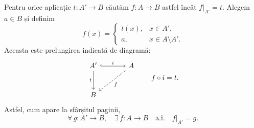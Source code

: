 \medskip
\noindent Pentru orice aplicație $t:A'\longrightarrow B$ căutăm
$f:A\longrightarrow B$ astfel încât $f|_{A'}=t$.
Alegem $a\in B$ și definim
\[
 f(x)=
 \begin{cases}
   t(x),&x\in A',\\
   a,&x\in A\setminus A'.
 \end{cases}
\]
Aceasta este prelungirea indicată de diagramă:
\[
\begin{tikzcd}[column sep=large,row sep=large]
 A'\arrow[r,hook,"i"]\arrow[d,"t"']
    & A\arrow[dl,dashed,"f"]\\
 B &
\end{tikzcd}
\qquad f\circ i=t.
\]
Astfel, cum apare la sfârșitul paginii,
\[
 \forall\,g:A'\longrightarrow B,\quad
 \exists\,f:A\longrightarrow B
 \quad\text{a.î.}\quad f|_{A'}=g.
\]

\endgroup
